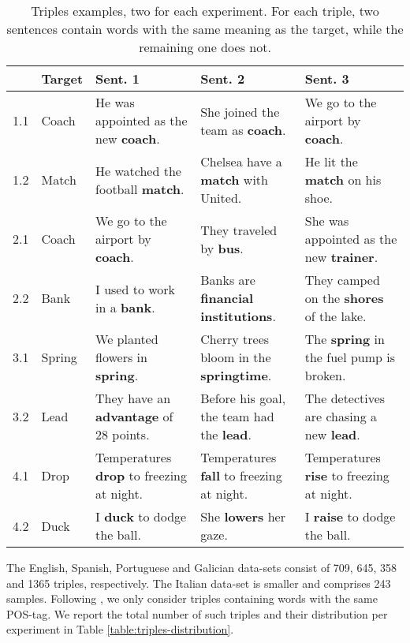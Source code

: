 \begin{table*}[h]
    \centering
    \begin{tabularx}{\textwidth}{llXXX}
        \hline
        & \textbf{Target} & \textbf{Sent. 1} & \textbf{Sent. 2} & \textbf{Sent. 3} \\ \hline

        1.1 & Coach & He was appointed as the new \textbf{coach}. & She joined the team as \textbf{coach}. & We go to the airport by \textbf{coach}. \\ \hline
        1.2 & Match & He watched the football \textbf{match}. & Chelsea have a \textbf{match} with United. & He lit the \textbf{match} on his shoe. \\ \hline

        2.1 & Coach & We go to the airport by \textbf{coach}. & They traveled by \textbf{bus}. & She was appointed as the new \textbf{trainer}. \\ \hline
        2.2 & Bank & I used to work in a \textbf{bank}. & Banks are \textbf{financial institutions}. &  They camped on the \textbf{shores} of the lake. \\ \hline

        3.1 & Spring & We planted flowers in \textbf{spring}. & Cherry trees bloom in the \textbf{springtime}. & The \textbf{spring} in the fuel pump is broken. \\ \hline
        3.2 & Lead & They have an \textbf{advantage} of 28 points. & Before his goal, the team had the \textbf{lead}. & The detectives are chasing a new \textbf{lead}. \\ \hline

        4.1 & Drop & Temperatures \textbf{drop} to freezing at night. & Temperatures \textbf{fall} to freezing at night. & Temperatures \textbf{rise} to freezing at night. \\ \hline
        4.2 & Duck & I \textbf{duck} to dodge the ball. & She \textbf{lowers} her gaze. & I \textbf{raise} to dodge the ball. \\ \hline
    \end{tabularx}
\caption{Triples examples, two for each experiment. For each triple, two sentences contain words with the same meaning as the target, while the remaining one does not.}\label{table:triples-examples}
\end{table*}

The English, Spanish, Portuguese and Galician data-sets consist of 709, 645, 358 and 1365 triples, respectively. The Italian data-set is smaller and comprises 243 samples. Following \citet{garcia:acl}, we only consider triples containing words with the same POS-tag. We report the total number of such triples and their distribution per experiment in Table \ref{table:triples-distribution}.

